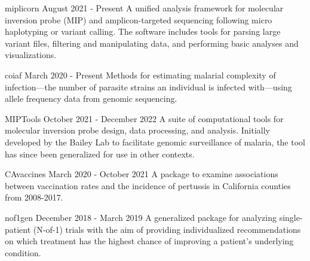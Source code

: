 
\begin{cvprojects}

  \cvproject
    {miplicorn} %
    {August 2021 - Present} %
    {A unified analysis framework for molecular inversion probe (MIP) and
    amplicon-targeted sequencing following micro haplotyping or variant 
    calling. The software includes tools for parsing large variant files, 
    filtering and manipulating data, and performing basic analyses and 
    visualizations.}

  \cvproject
    {coiaf} %
    {March 2020 - Present} %
    {Methods for estimating malarial complexity of infection—the
    number of parasite strains an individual is infected with—using allele
    frequency data from genomic sequencing.} %

  \cvproject
    {MIPTools}
    {October 2021 - December 2022}
    {A suite of computational tools for molecular inversion probe design, data
    processing, and analysis. Initially developed by the Bailey Lab to
    facilitate genomic surveillance of malaria, the tool has since been
    generalized for use in other contexts.}

  \cvproject
    {CAvaccines}
    {March 2020 - October 2021}
    {A package to examine associations between vaccination rates and the
    incidence of pertussis in California counties from 2008-2017.}

  \cvproject
    {nof1gen}
    {December 2018 - March 2019}
    {A generalized package for analyzing single-patient (N-of-1) trials with
    the aim of providing individualized recommendations on which treatment has
    the highest chance of improving a patient's underlying condition.}

\end{cvprojects}
